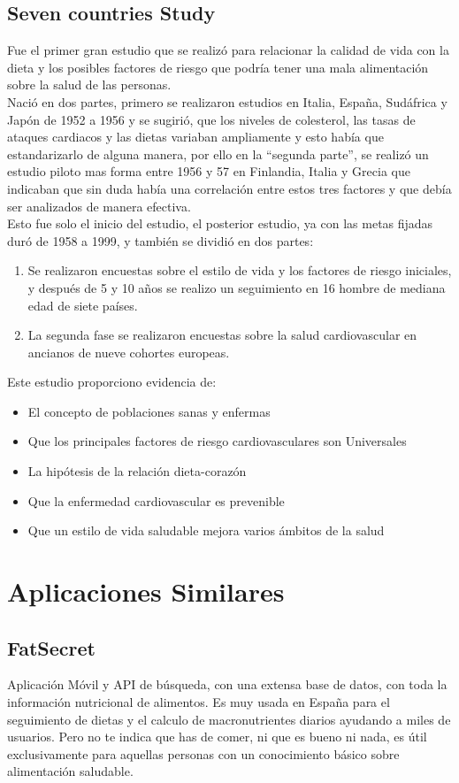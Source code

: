 \subsection{Seven countries Study}
Fue el primer gran estudio que se realizó para relacionar la calidad de vida con la dieta y los posibles factores de riesgo que podría tener una mala alimentación sobre la salud de las personas.\\
Nació en dos partes, primero se realizaron estudios en Italia, España, Sudáfrica y Japón de 1952 a 1956 y se sugirió, que los niveles de colesterol, las tasas de ataques cardiacos y las dietas variaban ampliamente y esto había que estandarizarlo de alguna manera, por ello en la “segunda parte”, se realizó un estudio piloto mas forma entre 1956 y 57 en Finlandia, Italia y Grecia que indicaban que sin duda había una correlación entre estos tres factores y que debía ser analizados de manera efectiva.\\
Esto fue solo el inicio del estudio, el posterior estudio, ya con las metas fijadas duró de 1958 a 1999, y también se dividió en dos partes:\\
\begin{enumerate}
	\item Se realizaron encuestas sobre el estilo de vida y los factores de riesgo iniciales, y después de 5 y 10 años se realizo un seguimiento en 16 hombre de mediana edad de siete países.
	\item La segunda fase se realizaron encuestas sobre la salud cardiovascular en ancianos de nueve cohortes europeas.
\end{enumerate}
Este estudio proporciono evidencia de:
\begin{itemize}
\item El concepto de poblaciones sanas y enfermas
\item Que los principales factores de riesgo cardiovasculares son Universales
\item La hipótesis de la relación dieta-corazón
\item Que la enfermedad cardiovascular es prevenible
\item Que un estilo de vida saludable mejora varios ámbitos de la salud

\end{itemize}

\section{Aplicaciones Similares}
\subsection{FatSecret}
Aplicación Móvil y API de búsqueda, con una extensa base de datos, con toda la información nutricional de alimentos. Es muy usada en España para el seguimiento de dietas y el calculo de macronutrientes diarios ayudando a miles de usuarios. Pero no te indica que has de comer, ni que es bueno ni nada, es útil exclusivamente para aquellas personas con un conocimiento básico sobre alimentación saludable. \\
